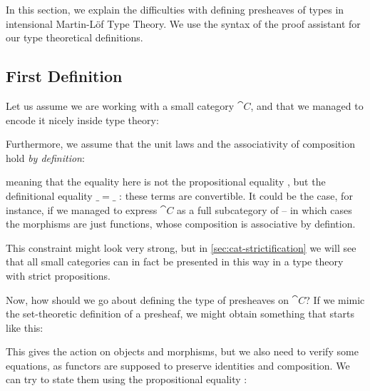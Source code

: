 In this section, we explain the difficulties with defining presheaves of types
in intensional Martin-Löf Type Theory. 
% 
We use the syntax of the \Agda proof assistant for our type theoretical 
definitions.

\subsection{First Definition}

Let us assume we are working with a small category \( \cat{C} \), and that we
managed to encode it nicely inside type theory:


Furthermore, we assume that the unit laws and the associativity of
composition hold \emph{by definition}:
% 


meaning that the equality here is not the propositional equality ,
but the definitional equality \( \_=\_\) : these terms are convertible. 
% 
It could be the case, for instance, if we managed to express \( \cat{C} \) as a 
full subcategory of  -- in which cases the morphisms are just 
functions, whose composition is associative by defintion.

This constraint might look very strong, but in \cref{sec:cat-strictification}
we will see that all small categories can in fact be presented in this way
in a type theory with strict propositions.

Now, how should we go about defining the type of presheaves on \( \cat{C} \)?
If we mimic the set-theoretic definition of a presheaf, we might obtain 
something that starts like this:


This gives the action on objects and morphisms, but we also need to verify some 
equations, as functors are supposed to preserve identities and composition.
% 
We can try to state them using the propositional equality :

